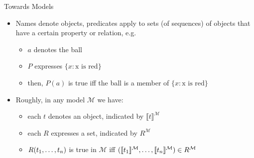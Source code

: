 \begin{frame}{Towards Models}

	\begin{itemize}%
	\itemsep=16pt
	
		\item Names denote objects, predicates apply to sets (of sequences) of objects that have a certain property or relation, e.g.
		
		\begin{itemize}
		
			\item $a$ denotes the ball
				
			\item $P$ expresses $\{x:\text{x is red}\}$
			
			\item then, $P(a)$ is true iff the ball is a member of $\{x:\text{x is red}\}$ 
		
		\end{itemize}		
		
		\item Roughly, in any model $\mathcal{M}$ we have: 
	
			\begin{itemize}
			
				\item each $t$ denotes an object, indicated by $\llbracket t\rrbracket^\mathcal{M}$
				
				\item each $R$ expresses a set, indicated by $R^\mathcal{M}$
				
				\item $R(t_1, \mathellipsis, t_n)$ is true in $\mathcal{M}$ iff $(\llbracket t_1\rrbracket^\mathcal{M}, \mathellipsis, \llbracket t_n\rrbracket^\mathcal{M})\in R^\mathcal{M}$
				
			\end{itemize}

	\end{itemize}

\end{frame}


